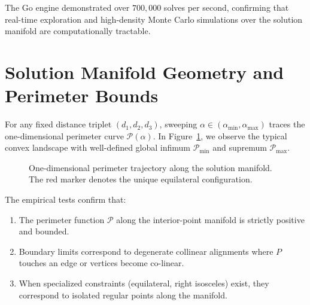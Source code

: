 The Go engine demonstrated over $700,000$ solves per second, confirming that real-time exploration and high-density Monte Carlo simulations over the solution manifold are computationally tractable.

\section{Solution Manifold Geometry and Perimeter Bounds}
For any fixed distance triplet $(d_1, d_2, d_3)$, sweeping $\alpha \in (\alpha_{\min}, \alpha_{\max})$ traces the one-dimensional perimeter curve $\mathcal{P}(\alpha)$. In Figure~\ref{fig:manifold-bounds}, we observe the typical convex landscape with well-defined global infimum $\mathcal{P}_{\min}$ and supremum $\mathcal{P}_{\max}$.

\begin{figure}[h!]
\centering
{}
\caption{One-dimensional perimeter trajectory along the solution manifold. The red marker denotes the unique equilateral configuration.}
\label{fig:manifold-bounds}
\end{figure}

The empirical tests confirm that:
\begin{enumerate}
    \item The perimeter function $\mathcal{P}$ along the interior-point manifold is strictly positive and bounded.
    \item Boundary limits correspond to degenerate collinear alignments where $P$ touches an edge or vertices become co-linear.
    \item When specialized constraints (equilateral, right isosceles) exist, they correspond to isolated regular points along the manifold.
\end{enumerate}
